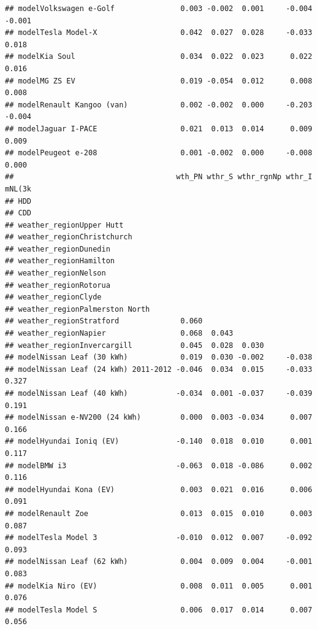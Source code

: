 \documentclass[
]{article}
\begin{document}
\begin{verbatim}
## modelVolkswagen e-Golf               0.003 -0.002  0.001     -0.004 -0.001    
## modelTesla Model-X                   0.042  0.027  0.028     -0.033  0.018    
## modelKia Soul                        0.034  0.022  0.023      0.022  0.016    
## modelMG ZS EV                        0.019 -0.054  0.012      0.008  0.008    
## modelRenault Kangoo (van)            0.002 -0.002  0.000     -0.203 -0.004    
## modelJaguar I-PACE                   0.021  0.013  0.014      0.009  0.009    
## modelPeugeot e-208                   0.001 -0.002  0.000     -0.008  0.000    
##                                     wth_PN wthr_S wthr_rgnNp wthr_I mNL(3k
## HDD                                                                       
## CDD                                                                       
## weather_regionUpper Hutt                                                  
## weather_regionChristchurch                                                
## weather_regionDunedin                                                     
## weather_regionHamilton                                                    
## weather_regionNelson                                                      
## weather_regionRotorua                                                     
## weather_regionClyde                                                       
## weather_regionPalmerston North                                            
## weather_regionStratford              0.060                                
## weather_regionNapier                 0.068  0.043                         
## weather_regionInvercargill           0.045  0.028  0.030                  
## modelNissan Leaf (30 kWh)            0.019  0.030 -0.002     -0.038       
## modelNissan Leaf (24 kWh) 2011-2012 -0.046  0.034  0.015     -0.033  0.327
## modelNissan Leaf (40 kWh)           -0.034  0.001 -0.037     -0.039  0.191
## modelNissan e-NV200 (24 kWh)         0.000  0.003 -0.034      0.007  0.166
## modelHyundai Ioniq (EV)             -0.140  0.018  0.010      0.001  0.117
## modelBMW i3                         -0.063  0.018 -0.086      0.002  0.116
## modelHyundai Kona (EV)               0.003  0.021  0.016      0.006  0.091
## modelRenault Zoe                     0.013  0.015  0.010      0.003  0.087
## modelTesla Model 3                  -0.010  0.012  0.007     -0.092  0.093
## modelNissan Leaf (62 kWh)            0.004  0.009  0.004     -0.001  0.083
## modelKia Niro (EV)                   0.008  0.011  0.005      0.001  0.076
## modelTesla Model S                   0.006  0.017  0.014      0.007  0.056

\end{verbatim}
\end{document}

